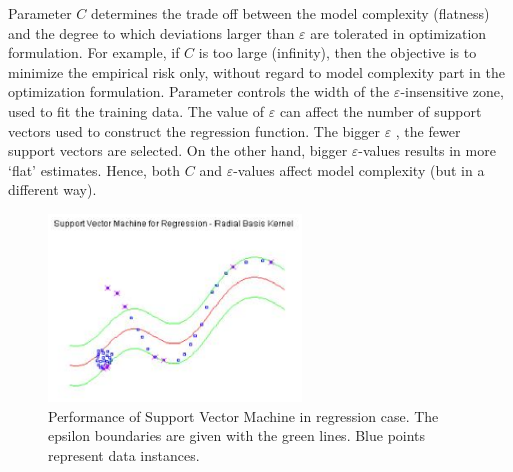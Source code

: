 Parameter $C$ determines the trade off between the model complexity (flatness) and the degree 
to which deviations larger than $\varepsilon$  are tolerated in optimization formulation.
For example, if $C$ is too large (infinity), then the objective is to minimize the empirical 
risk only, without regard to model complexity part in the optimization formulation.
Parameter controls the width of the $\varepsilon$-insensitive zone, used to fit the training data.
The value of $\varepsilon$ can affect the number of support vectors used to construct the
regression function. 
The bigger $\varepsilon$ , the fewer support vectors are selected. On the other hand, 
bigger $\varepsilon$-values results in more ‘flat’ estimates.
Hence, both $C$ and $\varepsilon$-values affect model complexity (but in a different way).
\begin{figure}[htb] 
	\label{fig:svm_demo2}
	\centering
	\includegraphics[width=0.6\textwidth]{figures/svm_demo2}
	\caption{Performance of Support Vector Machine in regression case.
	The epsilon boundaries are given with the green lines. Blue points represent data instances.}
\end{figure}

